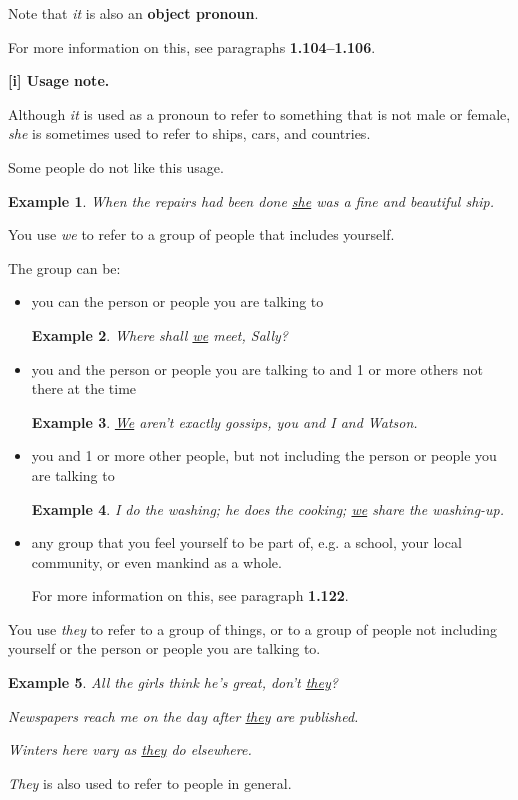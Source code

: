 \documentclass[oneside]{book}
\numberwithin{equation}{section}
\newtheorem{example}{Example}[section]
\begin{document}
%
Note that \textit{it} is also an \textbf{object pronoun}.

For more information on this, see paragraphs \textbf{1.104--1.106}.

%
\textbf{[i] Usage note.}

%
\noindent{} Although \textit{it} is used as a pronoun to refer to something that is not male or female, \textit{she} is sometimes used to refer to ships, cars, and countries.

Some people do not like this usage.
\begin{example}
    When the repairs had been done \underline{she} was a fine and beautiful ship.
\end{example}
%
\noindent{} You use \textit{we} to refer to a group of people that includes yourself.

The group can be:
\begin{itemize}
    \item you can the person or people you are talking to
    \begin{example}
        Where shall \underline{we} meet, Sally?
    \end{example}
    \item you and the person or people you are talking to and 1 or more others not there at the time
    \begin{example}
        \underline{We} aren't exactly gossips, you and I and Watson.
    \end{example}
    \item you and 1 or more other people, but not including the person or people you are talking to
    \begin{example}
        I do the washing; he does the cooking; \underline{we} share the washing-up.
    \end{example}
    \item any group that you feel yourself to be part of, e.g. a school, your local community, or even mankind as a whole.
    
    For more information on this, see paragraph \textbf{1.122}.
\end{itemize}
%
\noindent{} You use \textit{they} to refer to a group of things, or to a group of people not including yourself or the person or people you are talking to.
\begin{example}
    All the girls think he's great, don't \underline{they}?
    
    Newspapers reach me on the day after \underline{they} are published.
    
    Winters here vary as \underline{they} do elsewhere.
\end{example}
\textit{They} is also used to refer to people in general.
\end{document}
